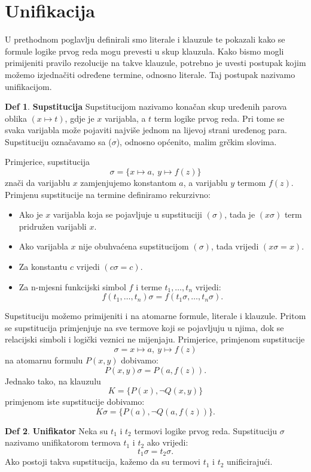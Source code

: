 \documentclass{article}
\theoremstyle{definition}
\newtheorem{definicija}{Def}[section]
\theoremstyle{plain}
\begin{document}
\section{Unifikacija}
U prethodnom poglavlju definirali smo literale i klauzule te pokazali kako se formule logike prvog reda mogu prevesti u skup klauzula. Kako bismo mogli primijeniti pravilo rezolucije na takve klauzule, potrebno je uvesti postupak kojim možemo izjednačiti određene termine, odnosno literale. Taj postupak nazivamo unifikacijom.
\begin{definicija}\textbf{Supstitucija}\newline
Supstitucijom nazivamo konačan skup uređenih parova oblika $(x\mapsto t)$, gdje je $x$ varijabla, a $t$ term logike prvog reda. Pri tome se svaka varijabla može pojaviti najviše jednom na lijevoj strani uređenog para. Supstituciju označavamo sa ($\sigma$), odnosno općenito, malim grčkim slovima.
\end{definicija}
Primjerice, supstitucija
\[
\sigma=\{x\mapsto a,\ y\mapsto f(z)\}
\]
znači da varijablu $x$ zamjenjujemo konstantom $a$, a varijablu $y$ termom $f(z)$.
Primjenu supstitucije na termine definiramo rekurzivno:
\begin{itemize}
\item Ako je $x$ varijabla koja se pojavljuje u supstituciji $(\sigma)$, tada je $(x\sigma)$ term pridružen varijabli $x$.
\item Ako varijabla $x$ nije obuhvaćena supstitucijom $(\sigma)$, tada vrijedi $(x\sigma = x)$.
\item Za konstantu $c$ vrijedi $(c\sigma = c)$.
\item Za n-mjesni funkcijski simbol $f$ i terme $t_1,\ldots,t_n$ vrijedi:
\[
f(t_1,\ldots,t_n)\sigma
=
f(t_1\sigma,\ldots,t_n\sigma).
\]
\end{itemize}
Supstituciju možemo primijeniti i na atomarne formule, literale i klauzule. Pritom se supstitucija primjenjuje na sve termove koji se pojavljuju u njima, dok se relacijski simboli i logički veznici ne mijenjaju.
Primjerice, primjenom supstitucije
\[
\sigma={x\mapsto a,\ y\mapsto f(z)}
\]
na atomarnu formulu $P(x,y)$ dobivamo:
\[
P(x,y)\sigma=P(a,f(z)).
\]
Jednako tako, na klauzulu
\[
K=\{P(x),\neg Q(x,y)\}
\]
primjenom iste supstitucije dobivamo:
\[
K\sigma=\{P(a),\neg Q(a,f(z))\}.
\]
\begin{definicija}\textbf{Unifikator}\newline
Neka su $t_1$ i $t_2$ termovi logike prvog reda. Supstituciju $\sigma$ nazivamo unifikatorom termova $t_1$ i $t_2$ ako vrijedi:
\[
t_1\sigma=t_2\sigma.
\]
Ako postoji takva supstitucija, kažemo da su termovi $t_1$ i $t_2$ unificirajući.
\end{definicija}
\end{document}
